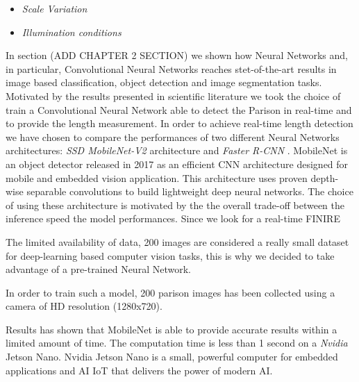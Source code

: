 \begin{itemize}
    \item \textit{Scale Variation}
    \item \textit{Illumination conditions}
\end{itemize}

In section (ADD CHAPTER 2 SECTION) we shown how Neural Networks and, in particular, Convolutional Neural Networks reaches stet-of-the-art results in image based classification, object detection and image segmentation tasks. Motivated by the results presented in scientific literature we took the choice of train a Convolutional Neural Network able to detect the Parison in real-time and to provide the length measurement. In order to achieve real-time length detection we have chosen to compare the performances of two different Neural Networks architectures: \textit{SSD MobileNet-V2} architecture \citep{sandler2018mobilenetv2} and \textit{Faster R-CNN} \citep{ren2015faster}. MobileNet is an object detector released in 2017 as an efficient CNN architecture designed for mobile and embedded vision application. This architecture uses proven depth-wise separable convolutions to build lightweight deep neural networks. The choice of using these architecture is motivated by the the overall trade-off between the inference speed the model performances. Since we look for a real-time FINIRE  

The limited availability of data, 200 images are considered a really small dataset for deep-learning based computer vision tasks, this is why we decided to take advantage of a pre-trained Neural Network.

In order to train such a model, 200 parison images has been collected using a camera of HD resolution (1280x720). 


Results has shown that MobileNet is able to provide accurate results within a limited amount of time. The computation time is less than 1 second on a \textit{Nvidia} Jetson Nano. Nvidia Jetson Nano is a small, powerful computer for embedded applications and AI IoT that delivers the power of modern AI. 


